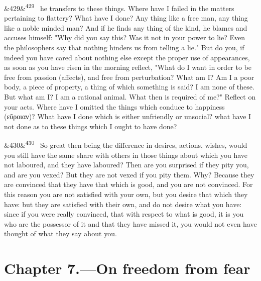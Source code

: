 \documentclass[12pt]{article}
\newcommand{\para}[1][]{\par\noindent\ifx&#1&\else\textsuperscript{\footnotesize #1}~\fi}
\begin{document}
\para[429] he transfers to these things. Where have I failed in the matters pertaining to flattery? What have I done? Any thing like a free man, any thing like a noble minded man? And if he finds any thing of the kind, he blames and accuses himself: "Why did you say this? Was it not in your power to lie? Even the philosophers say that nothing hinders us from telling a lie." But do you, if indeed you have cared about nothing else except the proper use of appearances, as soon as you have risen in the morning reflect, "What do I want in order to be free from passion (affects), and free from perturbation? What am I? Am I a poor body, a piece of property, a thing of which something is said? I am none of these. But what am I? I am a rational animal. What then is required of me?" Reflect on your acts. Where have I omitted the things which conduce to happiness (εὔροιαν)? What have I done which is either unfriendly or unsocial? what have I not done as to these things which I ought to have done?

\para[430] So great then being the difference in desires, actions, wishes, would you still have the same share with others in those things about which you have not laboured, and they have laboured? Then are you surprised if they pity you, and are you vexed? But they are not vexed if you pity them. Why? Because they are convinced that they have that which is good, and you are not convinced. For this reason you are not satisfied with your own, but you desire that which they have: but they are satisfied with their own, and do not desire what you have: since if you were really convinced, that with respect to what is good, it is you who are the possessor of it and that they have missed it, you would not even have thought of what they say about you.

\section*{Chapter 7.---On freedom from fear}
\end{document}
